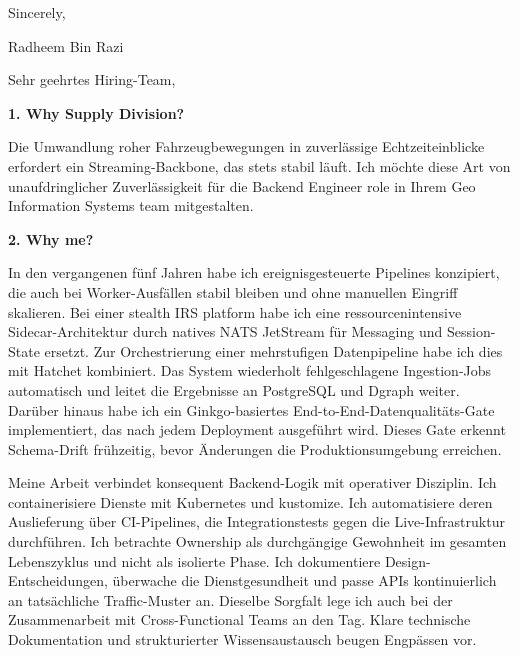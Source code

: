 \documentclass[11pt,a4paper]{coverletter}
\begin{document}
\closing{Sincerely,}{Radheem Bin Razi}

\clearpage
{}


\opening{Sehr geehrtes Hiring-Team,}

\vspace{8pt}\noindent\textbf{1. Why Supply Division?}\par\vspace{3pt}

Die Umwandlung roher Fahrzeugbewegungen in zuverlässige Echtzeiteinblicke erfordert ein Streaming-Backbone, das stets stabil läuft. Ich möchte diese Art von unaufdringlicher Zuverlässigkeit für die Backend Engineer role in Ihrem Geo Information Systems team mitgestalten.

\vspace{8pt}\noindent\textbf{2. Why me?}\par\vspace{3pt}

In den vergangenen fünf Jahren habe ich ereignisgesteuerte Pipelines konzipiert, die auch bei Worker-Ausfällen stabil bleiben und ohne manuellen Eingriff skalieren. Bei einer stealth IRS platform habe ich eine ressourcenintensive Sidecar-Architektur durch natives NATS JetStream für Messaging und Session-State ersetzt. Zur Orchestrierung einer mehrstufigen Datenpipeline habe ich dies mit Hatchet kombiniert. Das System wiederholt fehlgeschlagene Ingestion-Jobs automatisch und leitet die Ergebnisse an PostgreSQL und Dgraph weiter. Darüber hinaus habe ich ein Ginkgo-basiertes End-to-End-Datenqualitäts-Gate implementiert, das nach jedem Deployment ausgeführt wird. Dieses Gate erkennt Schema-Drift frühzeitig, bevor Änderungen die Produktionsumgebung erreichen.

Meine Arbeit verbindet konsequent Backend-Logik mit operativer Disziplin. Ich containerisiere Dienste mit Kubernetes und kustomize. Ich automatisiere deren Auslieferung über CI-Pipelines, die Integrationstests gegen die Live-Infrastruktur durchführen. Ich betrachte Ownership als durchgängige Gewohnheit im gesamten Lebenszyklus und nicht als isolierte Phase. Ich dokumentiere Design-Entscheidungen, überwache die Dienstgesundheit und passe APIs kontinuierlich an tatsächliche Traffic-Muster an. Dieselbe Sorgfalt lege ich auch bei der Zusammenarbeit mit Cross-Functional Teams an den Tag. Klare technische Dokumentation und strukturierter Wissensaustausch beugen Engpässen vor.
\end{document}

